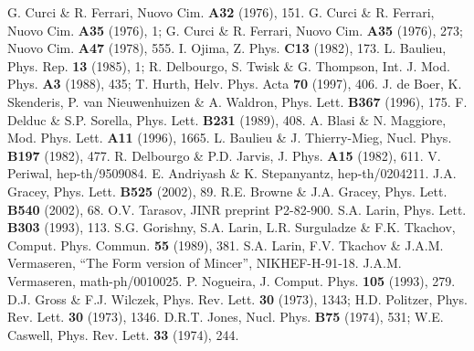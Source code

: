 \documentclass[a4paper,11pt]{article}
\begin{document}
\begin{thebibliography}{99}
 G. Curci \& R. Ferrari, Nuovo Cim. {\bf A32} (1976), 151. 
 G. Curci \& R. Ferrari, Nuovo Cim. {\bf A35} (1976), 1; 
G. Curci \& R. Ferrari, Nuovo Cim. {\bf A35} (1976), 273; 
Nuovo Cim. {\bf A47} (1978), 555. 
 I. Ojima, Z. Phys. {\bf C13} (1982), 173.  
 L. Baulieu, Phys. Rep. {\bf 13} (1985), 1; 
R. Delbourgo, S. Twisk \& G. Thompson, Int. J. Mod. Phys. {\bf A3} (1988), 435;
T. Hurth, Helv. Phys. Acta {\bf 70} (1997), 406. 
 J. de Boer, K. Skenderis, P. van Nieuwenhuizen \& A. Waldron, Phys.
Lett. {\bf B367} (1996), 175. 
 F. Delduc \& S.P. Sorella, Phys. Lett. {\bf B231} (1989), 408. 
 A. Blasi \& N. Maggiore, Mod. Phys. Lett. {\bf A11} (1996), 1665. 
 L. Baulieu \& J. Thierry-Mieg, Nucl. Phys. {\bf B197} (1982), 477.
 R. Delbourgo \& P.D. Jarvis, J. Phys. {\bf A15} (1982), 611.
 V. Periwal, hep-th/9509084. 
 E. Andriyash \& K. Stepanyantz, hep-th/0204211. 
 J.A. Gracey, Phys. Lett. {\bf B525} (2002), 89. 
 R.E. Browne \& J.A. Gracey, Phys. Lett. {\bf B540} (2002), 68. 
 O.V. Tarasov, JINR preprint P2-82-900. 
 S.A. Larin, Phys. Lett. {\bf B303} (1993), 113.
 S.G. Gorishny, S.A. Larin, L.R. Surguladze \& F.K. Tkachov,
Comput. Phys. Commun. {\bf 55} (1989), 381. 
 S.A. Larin, F.V. Tkachov \& J.A.M. Vermaseren, ``The Form version
of Mincer'', NIKHEF-H-91-18. 
 J.A.M. Vermaseren, math-ph/0010025. 
 P. Nogueira, J. Comput. Phys. {\bf 105} (1993), 279. 
 D.J. Gross \& F.J. Wilczek, Phys. Rev. Lett. {\bf 30}
(1973), 1343; 
H.D. Politzer, Phys. Rev. Lett. {\bf 30} (1973), 1346.
 D.R.T. Jones, Nucl. Phys. {\bf B75} (1974), 531; 
W.E. Caswell, Phys. Rev. Lett. {\bf 33} (1974), 244. 

\end{thebibliography}
\end{document}
